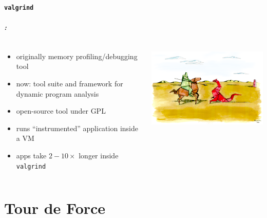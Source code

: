 \documentclass[9pt,xcolor=table]{beamer}
\begin{document}
\subsection{\texttt{valgrind}}
\begin{frame}
\frametitle{\insertsectionhead{}: \insertsubsectionhead{}}
  \begin{columns}[t]
    \begin{column}{.58\textwidth}
      \begin{itemize}
      \item originally memory profiling/debugging tool
      \item now: tool suite and framework for dynamic program analysis
      \item open-source tool under GPL
      \item runs ``instrumented'' application inside a VM
      \item apps take $2-10\times$ longer inside \texttt{valgrind}
      \end{itemize}
    \end{column}
    \begin{column}{.4\textwidth}
      \begin{center}
      \includegraphics[width=\textwidth]{img/Valgrind_logo}
    \end{center}
    
    \end{column}
  \end{columns}

\end{frame}


\part{Tour de Force}
\end{document}
